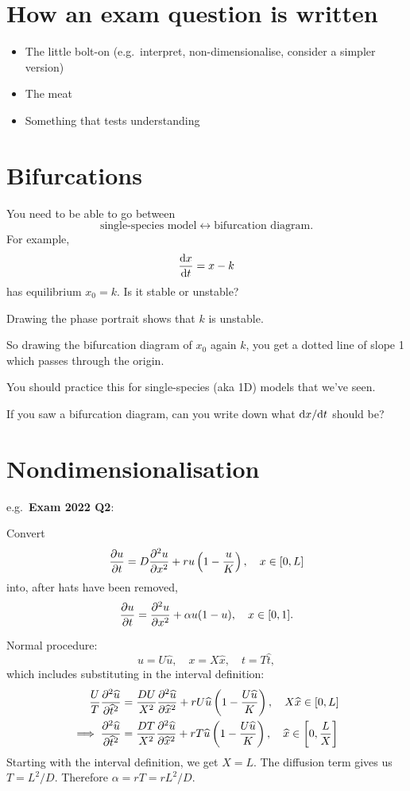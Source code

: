 \section{How an exam question is written}
\begin{itemize}
	\item The little bolt-on (e.g.\ interpret, non-dimensionalise, consider a simpler version)
	\item The meat
	\item Something that tests understanding
\end{itemize}
%
\section{Bifurcations}
You need to be able to go between
\[ \text{single-species model} \longleftrightarrow \text{bifurcation diagram}.\]
For example,
\[\fd{x}{t} = x-k\]
has equilibrium $x_0=k$. Is it stable or unstable? 

Drawing the phase portrait shows that $k$ is unstable.

So drawing the bifurcation diagram of $x_0$ again $k$, you get a dotted line of slope 1 which passes through the origin.

You should practice this for single-species (aka 1D) models that we've seen.

If you saw a bifurcation diagram, can you write down what $\fd{x}{t}$ should be?

\section{Nondimensionalisation}
e.g.\ \textbf{Exam 2022 Q2}:

Convert
\[ \pd{u}{t} = D \pdd{u}{x} + ru\left(1-\frac{u}{K}\right), \quad x \in [0,L] \]
into, after hats have been removed,
\[ \pd{u}{t} = \pdd{u}{x} + \alpha u(1-u), \quad x \in [0,1].\]

Normal procedure:
\[ u = U \hat{u}, \quad x = X\hat{x}, \quad t = T\hat{t},\]
which includes substituting in the interval definition:
\begin{align*}
	\frac{U}{T} \pdd{\hat{u}}{\hat{t}} &= \frac{DU}{X^2}\pdd{\hat{u}}{\hat{x}}+rU\hat{u}\left(1-\frac{U\hat{u}}{K}\right), \quad X \hat{x} \in [0,L]\\
	\implies \pdd{\hat{u}}{\hat{t}} &= \frac{DT}{X^2}\pdd{\hat{u}}{\hat{x}}+rT\hat{u}\left(1-\frac{U\hat{u}}{K}\right), \quad \hat{x} \in \left[0,\frac{L}{X}\right]
\end{align*}
Starting with the interval definition, we get $X=L$. The diffusion term gives us $T = L^2/D$. Therefore $\alpha = rT = rL^2/D$.

